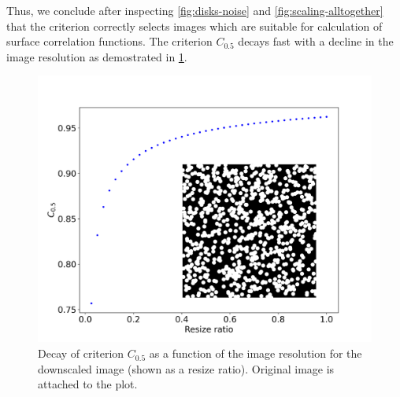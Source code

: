\documentclass[reprint,amsmath,amssymb,aps,pre,showkeys,showpacs]{revtex4-1}
\begin{document}
Thus, we conclude after inspecting \cref{fig:disks-noise} and
\cref{fig:scaling-alltogether} that the criterion correctly selects images which
are suitable for calculation of surface correlation functions. The criterion
$C_{0.5}$ decays fast with a decline in the image resolution as demostrated in
\cref{fig:crit-plot}.

\begin{figure}[ht]
  \centering
  \includegraphics[width=\linewidth]{images/plot-criterion1.png}
  \caption[]{Decay of criterion $C_{0.5}$ as a function of the image resolution
    for the downscaled image (shown as a resize ratio). Original image is
    attached to the plot.}
  \label{fig:crit-plot}
\end{figure}
\end{document}
